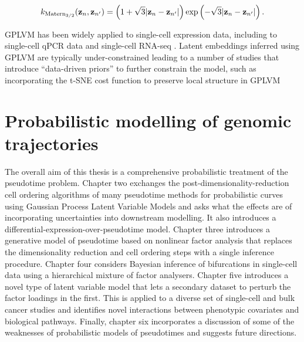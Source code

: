 \begin{equation}
  k_{\text{Matern}_{3/2}}(\mathbf{z}_n, \mathbf{z}_{n'}) =
  \left(
  1 + \sqrt{3} \lvert \mathbf{z}_n - \mathbf{z}_{n'} \rvert \right) \exp\left( - \sqrt{3} \lvert \mathbf{z}_n - \mathbf{z}_{n'} \rvert \right).
\end{equation}

GPLVM has been widely applied to single-cell expression data, including to single-cell qPCR data \cite{buettner2012novel} and single-cell RNA-seq \cite{campbell2016order,macaulay2016single}. Latent embeddings inferred using GPLVM are typically under-constrained leading to a number of studies that introduce ``data-driven priors'' to further constrain the model, such as incorporating the t-SNE cost function to preserve local structure in GPLVM \cite{van2009preserving}

\section{Probabilistic modelling of genomic trajectories}

The overall aim of this thesis is a comprehensive probabilistic treatment of the pseudotime problem. Chapter two exchanges the post-dimensionality-reduction cell ordering algorithms of many pseudotime methods for probabilistic curves using Gaussian Process Latent Variable Models and asks what the effects are of incorporating uncertainties into downstream modelling. It also introduces a differential-expression-over-pseudotime model.
Chapter three introduces a generative model of pseudotime based on nonlinear factor analysis that replaces the dimensionality reduction and cell ordering steps with a single inference procedure.
Chapter four considers Bayesian inference of bifurcations in single-cell data using a hierarchical mixture of factor analysers.
Chapter five introduces a novel type of latent variable model that lets a secondary dataset to perturb the factor loadings in the first. This is applied to a diverse set of single-cell and bulk cancer studies and identifies novel interactions between phenotypic covariates and biological pathways.
Finally, chapter six incorporates a discussion of some of the weaknesses of probabilistic models of pseudotimes and suggests future directions.
